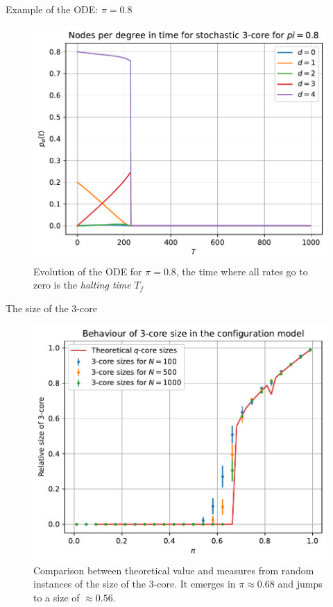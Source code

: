 \documentclass[handout]{beamer}
\begin{document}
\begin{frame}{Example of the ODE: $\pi=0.8$}
    \begin{figure}
        \centering
        \includegraphics[width=.6\textwidth]{ode_evol_pi08.pdf}
        \caption{Evolution of the ODE for $\pi=0.8$, the time where all rates
        go to zero is the \emph{halting time} $T_f$}
        \label{ref:ode_evol_pi03}
    \end{figure}
\end{frame}

\begin{frame}{The size of the 3-core}
    \begin{figure}
        \centering
        \includegraphics[height=.6\textheight]{qcore}
        \caption{Comparison between theoretical value and measures from random
        instances of the size of the 3-core. It emerges in $\pi\approx0.68$ and
        jumps to a size of $\approx0.56$.}
        \label{fig:qcore}
    \end{figure}
\end{frame}
\end{document}
